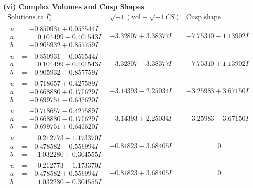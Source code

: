 \documentclass[1p]{elsarticle_modified}
\theoremstyle{definition}
\newcommand{\I}{\sqrt{-1}}
\begin{document}
\newpage\flushleft \textbf{(vi) Complex Volumes and Cusp Shapes}
$$\begin{array}{c|c|c}  
\text{Solutions to }I^u_{1}& \I (\text{vol} + \sqrt{-1}CS) & \text{Cusp shape}\\
 \hline 
\begin{aligned}
u &= -0.850931 + 0.053544 I \\
a &= \phantom{-}0.104499 - 0.401543 I \\
b &= -0.905932 + 0.857759 I\end{aligned}
 & -3.32807 + 3.38377 I & -7.75310 - 1.13902 I \\ \hline\begin{aligned}
u &= -0.850931 - 0.053544 I \\
a &= \phantom{-}0.104499 + 0.401543 I \\
b &= -0.905932 - 0.857759 I\end{aligned}
 & -3.32807 - 3.38377 I & -7.75310 + 1.13902 I \\ \hline\begin{aligned}
u &= -0.718657 + 0.427589 I \\
a &= -0.668880 + 0.170629 I \\
b &= -0.699751 - 0.643620 I\end{aligned}
 & -3.14393 - 2.25034 I & -3.25983 + 3.67150 I \\ \hline\begin{aligned}
u &= -0.718657 - 0.427589 I \\
a &= -0.668880 - 0.170629 I \\
b &= -0.699751 + 0.643620 I\end{aligned}
 & -3.14393 + 2.25034 I & -3.25983 - 3.67150 I \\ \hline\begin{aligned}
u &= \phantom{-}0.212773 + 1.173370 I \\
a &= -0.478582 - 0.559994 I \\
b &= \phantom{-}1.032280 + 0.304555 I\end{aligned}
 & -0.81823 - 3.68405 I & \phantom{-0.000000 } 0 \\ \hline\begin{aligned}
u &= \phantom{-}0.212773 - 1.173370 I \\
a &= -0.478582 + 0.559994 I \\
b &= \phantom{-}1.032280 - 0.304555 I\end{aligned}
 & -0.81823 + 3.68405 I & \phantom{-0.000000 } 0 \\ \hline\begin{aligned}

\end{aligned}
\end{array}$$
\end{document}
